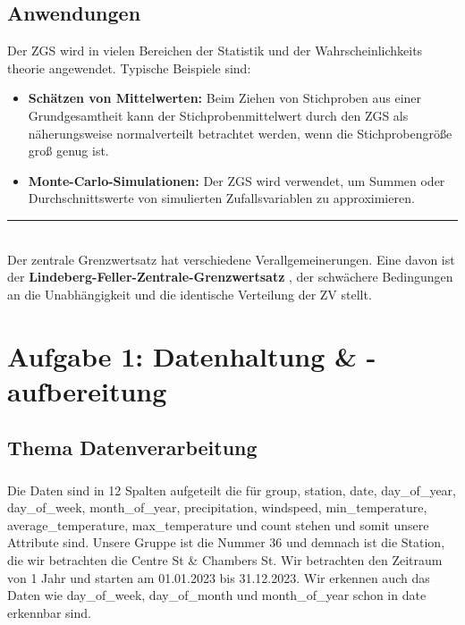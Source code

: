 \documentclass{article}
\begin{document}
\subsection{Anwendungen}
 
Der ZGS wird in vielen Bereichen der Statistik und der Wahrscheinlichkeits
theorie angewendet. Typische Beispiele sind:


\begin{itemize}
    \item \textbf{Schätzen von Mittelwerten:} Beim Ziehen von Stichproben aus einer Grundgesamtheit kann der Stichprobenmittelwert durch den ZGS als näherungsweise normalverteilt betrachtet werden, wenn die Stichprobengröße groß genug ist.
\item \textbf{Monte-Carlo-Simulationen:} Der ZGS wird verwendet, um Summen oder Durchschnittswerte von simulierten Zufallsvariablen zu approximieren.
\end{itemize}
\noindent
\rule[0.5ex]{0.5\textwidth}{0.4pt} \\[1ex]

\label{sec:3}Der zentrale Grenzwertsatz hat verschiedene Verallgemeinerungen. Eine davon ist der \textbf{Lindeberg-Feller-Zentrale-Grenzwertsatz} \cite[Seite 328]{Achim_Klenke}, der schwächere Bedingungen an die Unabhängigkeit und die identische Verteilung der ZV stellt.


\newpage

\section{Aufgabe 1: Datenhaltung \& -aufbereitung }


\subsection{Thema Datenverarbeitung}
\subsubsection{}

Die Daten sind in 12 Spalten aufgeteilt die für group, station, date, day\_of\_year, day\_of\_week, month\_of\_year, precipitation, windspeed, min\_temperature, average\_temperature, max\_temperature und count stehen und somit unsere Attribute sind. Unsere Gruppe ist die Nummer 36 und demnach ist die Station, die wir betrachten die Centre St \& Chambers St. Wir betrachten den Zeitraum von 1 Jahr und starten am 01.01.2023 bis 31.12.2023. Wir erkennen auch das Daten wie day\_of\_week, day\_of\_month und month\_of\_year schon in date erkennbar sind.
\end{document}
